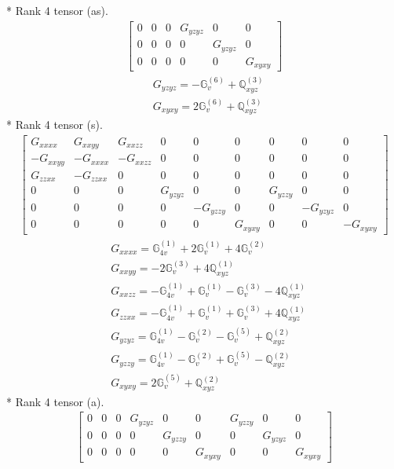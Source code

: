 \documentclass[fleqn,8pt,landscape]{jsarticle}
\begin{document}
* Rank 4 tensor (as).
\begin{align*}
\begin{bmatrix} 0 & 0 & 0 & G_{yzyz} & 0 & 0 \\ 0 & 0 & 0 & 0 & G_{yzyz} & 0 \\ 0 & 0 & 0 & 0 & 0 & G_{xyxy} \end{bmatrix}
\end{align*}
\begin{align*}
& G_{yzyz} = - \mathbb{G}_{v}^{(6)} + \mathbb{Q}_{xyz}^{(3)} \\
& G_{xyxy} = 2 \mathbb{G}_{v}^{(6)} + \mathbb{Q}_{xyz}^{(3)}
\end{align*}
* Rank 4 tensor (s).
\begin{align*}
\begin{bmatrix} G_{xxxx} & G_{xxyy} & G_{xxzz} & 0 & 0 & 0 & 0 & 0 & 0 \\ - G_{xxyy} & - G_{xxxx} & - G_{xxzz} & 0 & 0 & 0 & 0 & 0 & 0 \\ G_{zzxx} & - G_{zzxx} & 0 & 0 & 0 & 0 & 0 & 0 & 0 \\ 0 & 0 & 0 & G_{yzyz} & 0 & 0 & G_{yzzy} & 0 & 0 \\ 0 & 0 & 0 & 0 & - G_{yzzy} & 0 & 0 & - G_{yzyz} & 0 \\ 0 & 0 & 0 & 0 & 0 & G_{xyxy} & 0 & 0 & - G_{xyxy} \end{bmatrix}
\end{align*}
\begin{align*}
& G_{xxxx} = \mathbb{G}_{4v}^{(1)} + 2 \mathbb{G}_{v}^{(1)} + 4 \mathbb{G}_{v}^{(2)} \\
& G_{xxyy} = - 2 \mathbb{G}_{v}^{(3)} + 4 \mathbb{Q}_{xyz}^{(1)} \\
& G_{xxzz} = - \mathbb{G}_{4v}^{(1)} + \mathbb{G}_{v}^{(1)} - \mathbb{G}_{v}^{(3)} - 4 \mathbb{Q}_{xyz}^{(1)} \\
& G_{zzxx} = - \mathbb{G}_{4v}^{(1)} + \mathbb{G}_{v}^{(1)} + \mathbb{G}_{v}^{(3)} + 4 \mathbb{Q}_{xyz}^{(1)} \\
& G_{yzyz} = \mathbb{G}_{4v}^{(1)} - \mathbb{G}_{v}^{(2)} - \mathbb{G}_{v}^{(5)} + \mathbb{Q}_{xyz}^{(2)} \\
& G_{yzzy} = \mathbb{G}_{4v}^{(1)} - \mathbb{G}_{v}^{(2)} + \mathbb{G}_{v}^{(5)} - \mathbb{Q}_{xyz}^{(2)} \\
& G_{xyxy} = 2 \mathbb{G}_{v}^{(5)} + \mathbb{Q}_{xyz}^{(2)}
\end{align*}
* Rank 4 tensor (a).
\begin{align*}
\begin{bmatrix} 0 & 0 & 0 & G_{yzyz} & 0 & 0 & G_{yzzy} & 0 & 0 \\ 0 & 0 & 0 & 0 & G_{yzzy} & 0 & 0 & G_{yzyz} & 0 \\ 0 & 0 & 0 & 0 & 0 & G_{xyxy} & 0 & 0 & G_{xyxy} \end{bmatrix}
\end{align*}
\end{document}
